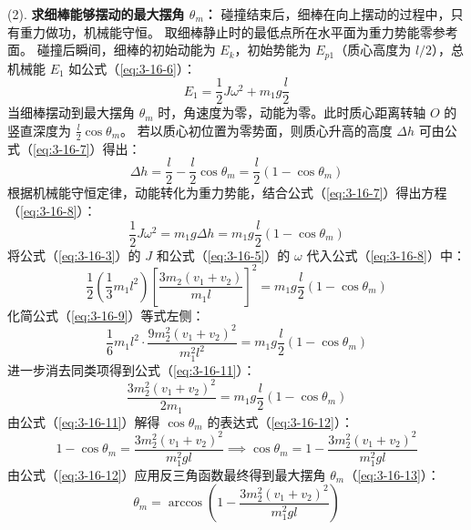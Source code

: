 (2). \textbf{求细棒能够摆动的最大摆角 $\theta_m$：}
碰撞结束后，细棒在向上摆动的过程中，只有重力做功，机械能守恒。
取细棒静止时的最低点所在水平面为重力势能零参考面。
碰撞后瞬间，细棒的初始动能为 $E_k$，初始势能为 $E_{p1}$（质心高度为 $l/2$），总机械能 $E_1$ 如公式（\ref{eq:3-16-6}）：
\begin{equation}\label{eq:3-16-6}
	E_1 = \frac{1}{2}J\omega^2 + m_1 g \frac{l}{2}
\end{equation}
当细棒摆动到最大摆角 $\theta_m$ 时，角速度为零，动能为零。此时质心距离转轴 $O$ 的竖直深度为 $\frac{l}{2}\cos\theta_m$。
若以质心初位置为零势面，则质心升高的高度 $\Delta h$ 可由公式（\ref{eq:3-16-7}）得出：
\begin{equation}\label{eq:3-16-7}
	\Delta h = \frac{l}{2} - \frac{l}{2}\cos\theta_m = \frac{l}{2}(1 - \cos\theta_m)
\end{equation}
根据机械能守恒定律，动能转化为重力势能，结合公式（\ref{eq:3-16-7}）得出方程（\ref{eq:3-16-8}）：
\begin{equation}\label{eq:3-16-8}
	\frac{1}{2}J\omega^2 = m_1 g \Delta h = m_1 g \frac{l}{2}(1 - \cos\theta_m)
\end{equation}
将公式（\ref{eq:3-16-3}）的 $J$ 和公式（\ref{eq:3-16-5}）的 $\omega$ 代入公式（\ref{eq:3-16-8}）中：
\begin{equation}\label{eq:3-16-9}
	\frac{1}{2}\left(\frac{1}{3}m_1 l^2\right) \left[ \frac{3m_2(v_1 + v_2)}{m_1 l} \right]^2 = m_1 g \frac{l}{2}(1 - \cos\theta_m)
\end{equation}
化简公式（\ref{eq:3-16-9}）等式左侧：
\begin{equation}\label{eq:3-16-10}
	\frac{1}{6} m_1 l^2 \cdot \frac{9 m_2^2 (v_1 + v_2)^2}{m_1^2 l^2} = m_1 g \frac{l}{2}(1 - \cos\theta_m)
\end{equation}
进一步消去同类项得到公式（\ref{eq:3-16-11}）：
\begin{equation}\label{eq:3-16-11}
	\frac{3 m_2^2 (v_1 + v_2)^2}{2 m_1} = m_1 g \frac{l}{2}(1 - \cos\theta_m)
\end{equation}
由公式（\ref{eq:3-16-11}）解得 $\cos\theta_m$ 的表达式（\ref{eq:3-16-12}）：
\begin{equation}\label{eq:3-16-12}
	1 - \cos\theta_m = \frac{3 m_2^2 (v_1 + v_2)^2}{m_1^2 g l} \implies \cos\theta_m = 1 - \frac{3 m_2^2 (v_1 + v_2)^2}{m_1^2 g l}
\end{equation}
由公式（\ref{eq:3-16-12}）应用反三角函数最终得到最大摆角 $\theta_m$（\ref{eq:3-16-13}）：
\begin{equation}\label{eq:3-16-13}
	\theta_m = \arccos\left(1 - \frac{3 m_2^2 (v_1 + v_2)^2}{m_1^2 g l}\right)
\end{equation}

